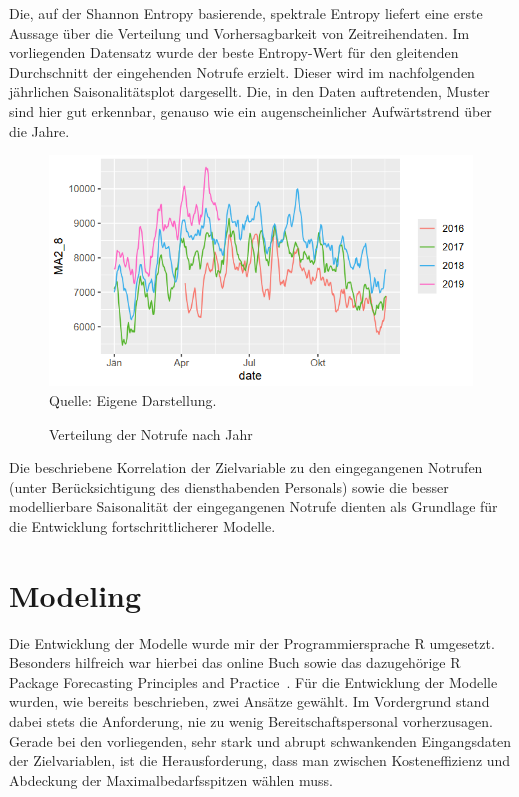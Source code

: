 Die, auf der Shannon Entropy basierende, spektrale Entropy liefert eine erste Aussage über die Verteilung und Vorhersagbarkeit von Zeitreihendaten. Im vorliegenden Datensatz wurde der beste Entropy-Wert für den gleitenden Durchschnitt der eingehenden Notrufe erzielt. Dieser wird im nachfolgenden jährlichen Saisonalitätsplot dargesellt. Die, in den Daten auftretenden, Muster sind hier gut erkennbar, genauso wie ein augenscheinlicher Aufwärtstrend über die Jahre.

\begin{figure}[h]
\centering
\caption{Verteilung der Notrufe nach Jahr}
\includegraphics[width=15cm]{01_resources/calls_year.png}\\
Quelle: Eigene Darstellung.
\label{fig:callsperyear}
\end{figure}
\FloatBarrier

Die beschriebene Korrelation der Zielvariable zu den eingegangenen Notrufen (unter Berücksichtigung des diensthabenden Personals) sowie die besser modellierbare Saisonalität der eingegangenen Notrufe dienten als Grundlage für die Entwicklung fortschrittlicherer Modelle.

\section{Modeling}

Die Entwicklung der Modelle wurde mir der Programmiersprache R umgesetzt. Besonders hilfreich war hierbei das online Buch sowie das dazugehörige R Package \glqq Forecasting Principles and Practice\grqq\ \citep{hyndman_forecasting_2021}. Für die Entwicklung der Modelle wurden, wie bereits beschrieben, zwei Ansätze gewählt.  Im Vordergrund stand dabei stets die Anforderung, nie zu wenig Bereitschaftspersonal vorherzusagen. Gerade bei den vorliegenden, sehr stark und abrupt schwankenden Eingangsdaten der Zielvariablen, ist die Herausforderung, dass man zwischen Kosteneffizienz und Abdeckung der Maximalbedarfsspitzen wählen muss.  

